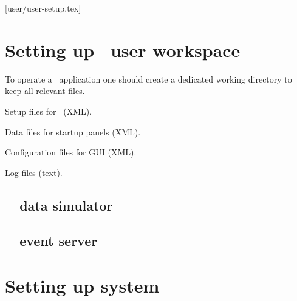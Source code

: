[user/user-setup.tex]
\section[Setting up DABC user workspace]{Setting up \dabc\ user workspace}
To operate a \dabc\ application one should create a dedicated 
working directory
to keep all relevant files.
\bbul
\item Setup files for \dabc\ (XML).
\item Data files for startup panels (XML).
\item Configuration files for GUI (XML).
\item Log files (text).
\ebul
\subsection[DABC MBS data simulator]{\dabc\ \mbs\ data simulator}
\subsection[DABC MBS event server]{\dabc\ \mbs\ event server}
\section{Setting up system}
